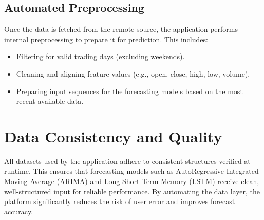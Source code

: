 \subsection{Automated Preprocessing}
Once the data is fetched from the remote source, the application performs internal preprocessing to prepare it for prediction. This includes:

\begin{itemize}
	\item Filtering for valid trading days (excluding weekends).
	\item Cleaning and aligning feature values (e.g., open, close, high, low, volume).
	\item Preparing input sequences for the forecasting models based on the most recent available data.
\end{itemize}

\section{Data Consistency and Quality}
All datasets used by the application adhere to consistent structures verified at runtime. This ensures that forecasting models such as AutoRegressive Integrated Moving Average (ARIMA) and Long Short-Term Memory (LSTM) receive clean, well-structured input for reliable performance. By automating the data layer, the platform significantly reduces the risk of user error and improves forecast accuracy.